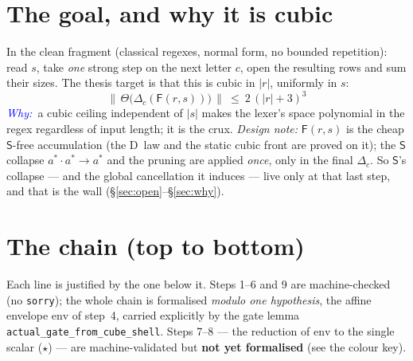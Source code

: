 \documentclass[11pt]{article}
\newcommand{\rs}[1]{\lvert #1\rvert}                 %
\newcommand{\rss}[1]{\lVert #1\rVert}                %
\newcommand{\Strong}{\mathsf{S}}                     %
\newcommand{\Front}{\mathsf{F}}                      %
\newcommand{\dstep}{\Delta}                          %
\newcommand{\opens}{\Theta}                          %
\newcommand{\seq}{\cdot}
\newcommand{\WHY}{\textit{\textcolor{blue}{Why:\ }}}
\theoremstyle{definition}
\begin{document}
\section{The goal, and why it is cubic}

In the clean fragment (classical regexes, normal form, no bounded repetition): read $s$, take \emph{one} strong step on
the next letter $c$, open the resulting rows and sum their sizes. The thesis target is that this is cubic in $\rs r$,
uniformly in $s$:
\[
\boxed{\ \rss{\,\opens\!\bigl(\dstep_c(\Front(r,s))\bigr)\,}\ \le\ 2\,(\rs r+3)^3\ }
\tag{Gate}
\]
\WHY a cubic ceiling independent of $\rs s$ makes the lexer's space polynomial in the regex regardless of input length;
it is the crux. \emph{Design note:} $\Front(r,s)$ is the cheap $\Strong$-free accumulation (the D~law and the static cubic
front are proved on it); the $\Strong$ collapse $a^{*}\seq a^{*}\to a^{*}$ and the pruning are applied \emph{once}, only in
the final $\dstep_c$. So $\Strong$'s collapse --- and the global cancellation it induces --- live only at that last step,
and that is the wall (\S\ref{sec:open}--\S\ref{sec:why}).

\section{The chain (top to bottom)}\label{sec:chain}

Each line is justified by the one below it. Steps 1--6 and 9 are machine-checked (no \texttt{sorry}); the whole chain is
formalised \emph{modulo one hypothesis}, the affine envelope $\mathrm{env}$ of step~4, carried explicitly by the gate lemma
\texttt{actual\_gate\_from\_cube\_shell}. Steps 7--8 --- the reduction of $\mathrm{env}$ to the single scalar ($\star$) ---
are machine-validated but \textbf{not yet formalised} (see the colour key).
\end{document}
